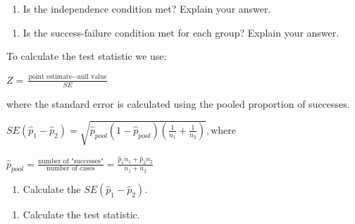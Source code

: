 \documentclass[
]{report}
\providecommand{\tightlist}{%
  \setlength{\itemsep}{0pt}\setlength{\parskip}{0pt}}
\begin{document}
\vspace{.25in}

\begin{enumerate}
\def\labelenumi{\arabic{enumi}.}
\setcounter{enumi}{15}
\tightlist
\item
  Is the independence condition met? Explain your answer.
\end{enumerate}

\vspace{1in}

\begin{enumerate}
\def\labelenumi{\arabic{enumi}.}
\setcounter{enumi}{16}
\tightlist
\item
  Is the success-failure condition met for each group? Explain your answer.
\end{enumerate}

\vspace{1in}

To calculate the test statistic we use:

\begin{center}
    $Z = \frac{\text{point estimate} - \text{null value}}{SE}$

where the standard error is calculated using the pooled proportion of successes.

   $SE(\hat{p}_1-\hat{p}_2)=\sqrt{\hat{p}_{pool}(1-\hat{p}_{pool})(\frac{1}{n_1}+\frac{1}{n_2})}, \text{where}$ 
    
   $\hat{p}_{pool} = \frac{\text{number of "successes"}}{\text{number of cases}} = \frac{\hat{p}_1 n_1+\hat{p}_2 n_2}{n_1+n_2}$
    
\end{center}

\vspace{.25in}

\begin{enumerate}
\def\labelenumi{\arabic{enumi}.}
\setcounter{enumi}{17}
\tightlist
\item
  Calculate the \(SE(\hat{p}_1-\hat{p}_2)\).
\end{enumerate}

\vspace{1in}

\begin{enumerate}
\def\labelenumi{\arabic{enumi}.}
\setcounter{enumi}{18}
\tightlist
\item
  Calculate the test statistic.
\end{enumerate}

\vspace{1in}
\end{document}
